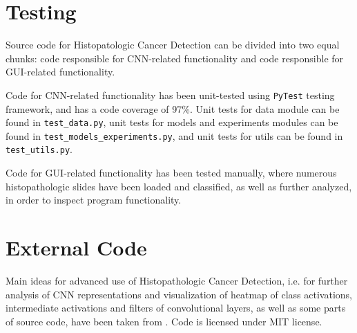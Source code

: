 \section{Testing}

Source code for Histopatologic Cancer Detection can be divided into two equal chunks: code responsible for CNN-related functionality and code responsible for GUI-related functionality.

Code for CNN-related functionality has been unit-tested using \texttt{PyTest} testing framework, and has a code coverage of 97\%. Unit tests for data module can be found in \texttt{test\_data.py}, unit tests for models and experiments modules can be found in \texttt{test\_models\_experiments.py}, and unit tests for utils can be found in \texttt{test\_utils.py}.

Code for GUI-related functionality has been tested manually, where numerous histopathologic slides have been loaded and classified, as well as further analyzed, in order to inspect program functionality. 

\section{External Code}

Main ideas for advanced use of Histopathologic Cancer Detection, i.e. for further analysis of CNN representations and visualization of heatmap of class activations, intermediate activations and filters of convolutional layers, as well as some parts of source code, have been taken from \cite{chollet2018deep}. Code is licensed under MIT license.
